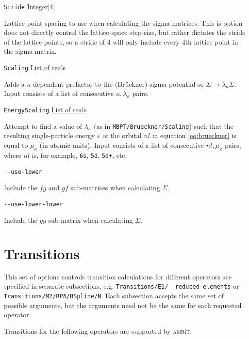 \documentclass{report}
\newcommand{\ambit}{\textsc{amb}{\footnotesize i}\textsc{t}}
\begin{document}
\texttt{Stride} \uline{Integer}[4]
\begin{adjustwidth}{1cm}{}
Lattice-point spacing to use when calculating the sigma matrices. This is option does not directly
control the lattice-space step-size, but rather dictates the stride of the lattice points, so a stride
of 4 will only include every 4th lattice point in the sigma matrix.
\end{adjustwidth}

\texttt{Scaling} \uline{List of reals}
\begin{adjustwidth}{1cm}{}
Adds a $\kappa$-dependent prefactor to the (Br\"{u}ckner) sigma potential so $\Sigma \to
\lambda_{\kappa}\Sigma$. Input consists of a list of consecutive $\kappa, \lambda_{\kappa}$ pairs.
\end{adjustwidth}

\texttt{EnergyScaling} \uline{List of reals}
\begin{adjustwidth}{1cm}{}
Attempt to find a value of $\lambda_{\kappa}$ (as in \texttt{MBPT/Brueckner/Scaling}) such that the resulting
single-particle energy $\varepsilon$ of the orbital $nl$ in equation \ref{eq:brueckner} is equal to $\mu_{\kappa}$ (in
atomic units). Input consists of a list of consecutive
$nl, \mu_{\kappa}$ pairs, where $nl$ is, for example, \texttt{6s}, \texttt{5d}, \texttt{5d+}, etc.
\end{adjustwidth}

\texttt{{-}{-}use-lower}
\begin{adjustwidth}{1cm}{}
Include the $fg$ and $gf$ sub-matrices when calculating $\Sigma$.
\end{adjustwidth}

\texttt{{-}{-}use-lower-lower}
\begin{adjustwidth}{1cm}{}
Include the $gg$ sub-matrix when calculating $\Sigma$.
\end{adjustwidth}

\section{Transitions}

This set of options controls transition calculations for different operators are specified in separate 
subsections, e.g. \texttt{Transitions/E1/{-}{-}reduced-elements} or 
\texttt{Transitions/M2/RPA/BSpline/N}. Each subsection accepts the same set 
of possible arguments, but the arguments need not be the same for each requested operator. 

Transitions for the following operators are supported by \ambit:
\end{document}
